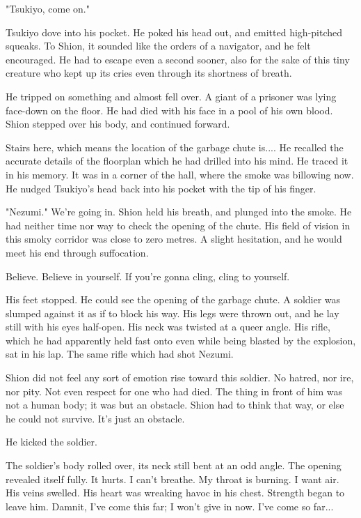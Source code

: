 "Tsukiyo, come on."

Tsukiyo dove into his pocket. He poked his head out, and emitted
high-pitched squeaks. To Shion, it sounded like the orders of a
navigator, and he felt encouraged. He had to escape even a second
sooner, also for the sake of this tiny creature who kept up its cries
even through its shortness of breath.

He tripped on something and almost fell over. A giant of a prisoner was
lying face-down on the floor. He had died with his face in a pool of his
own blood. Shion stepped over his body, and continued forward.

Stairs here, which means the location of the garbage chute is.... He
recalled the accurate details of the floorplan which he had drilled into
his mind. He traced it in his memory. It was in a corner of the hall,
where the smoke was billowing now. He nudged Tsukiyo's head back into
his pocket with the tip of his finger.

"Nezumi." We're going in. Shion held his breath, and plunged into the
smoke. He had neither time nor way to check the opening of the chute.
His field of vision in this smoky corridor was close to zero metres. A
slight hesitation, and he would meet his end through suffocation.

Believe. Believe in yourself. If you're gonna cling, cling to yourself.

His feet stopped. He could see the opening of the garbage chute. A
soldier was slumped against it as if to block his way. His legs were
thrown out, and he lay still with his eyes half-open. His neck was
twisted at a queer angle. His rifle, which he had apparently held fast
onto even while being blasted by the explosion, sat in his lap. The same
rifle which had shot Nezumi.

Shion did not feel any sort of emotion rise toward this soldier. No
hatred, nor ire, nor pity. Not even respect for one who had died. The
thing in front of him was not a human body; it was but an obstacle.
Shion had to think that way, or else he could not survive. It's just an
obstacle.

He kicked the soldier.

The soldier's body rolled over, its neck still bent at an odd angle. The
opening revealed itself fully. It hurts. I can't breathe. My throat is
burning. I want air. His veins swelled. His heart was wreaking havoc in
his chest. Strength began to leave him. Damnit, I've come this far; I
won't give in now. I've come so far...

